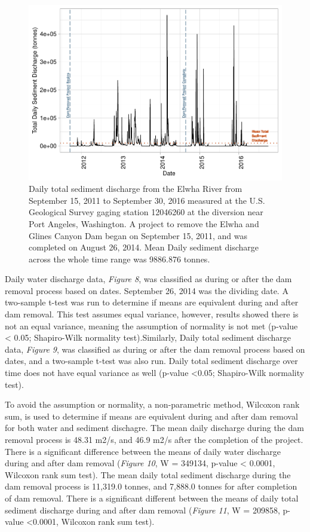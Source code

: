 \documentclass[12pt,]{article}
\begin{document}
\begin{figure}
\centering
\includegraphics{Mason_ENV872_ProjectFinal_files/figure-latex/Intro to Question (Figure 9)-1.pdf}
\caption{Daily total sediment discharge from the Elwha River from
September 15, 2011 to September 30, 2016 measured at the U.S. Geological
Survey gaging station 12046260 at the diversion near Port Angeles,
Washington. A project to remove the Elwha and Glines Canyon Dam began on
September 15, 2011, and was completed on August 26, 2014. Mean Daily
sediment discharge across the whole time range was 9886.876 tonnes.}
\end{figure}

Daily water discharge data, \emph{Figure 8}, was classified as during or
after the dam removal process based on dates. September 26, 2014 was the
dividing date. A two-sample t-test was run to determine if means are
equivalent during and after dam removal. This test assumes equal
variance, however, results showed there is not an equal variance,
meaning the assumption of normality is not met (p-value \textless{}
0.05; Shapiro-Wilk normality test).Similarly, Daily total sediment
discharge data, \emph{Figure 9}, was classified as during or after the
dam removal process based on dates, and a two-sample t-test was also
run. Daily total sediment discharge over time does not have equal
variance as well (p-value \textless{}0.05; Shapiro-Wilk normality test).

To avoid the assumption or normality, a non-parametric method, Wilcoxon
rank sum, is used to determine if means are equivalent during and after
dam removal for both water and sediment dischagre. The mean daily
discharge during the dam removal process is 48.31 m2/s, and 46.9 m2/s
after the completion of the project. There is a significant difference
between the means of daily water discharge during and after dam removal
(\emph{Figure 10}, W = 349134, p-value \textless{} 0.0001, Wilcoxon rank
sum test). The mean daily total sediment discharge during the dam
removal process is 11,319.0 tonnes, and 7,888.0 tonnes for after
completion of dam removal. There is a significant different between the
means of daily total sediment discharge during and after dam removal
(\emph{Figure 11}, W = 209858, p-value \textless{}0.0001, Wilcoxon rank
sum test).
\end{document}
